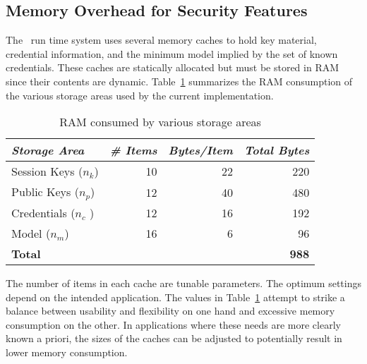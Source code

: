 \subsection{Memory Overhead for Security Features}

The \Sprocket\ run time system uses several memory caches to hold key material, credential
information, and the minimum model implied by the set of known credentials. These caches are
statically allocated but must be stored in RAM since their contents are dynamic.
Table~\ref{table-ram-consumed} summarizes the RAM consumption of the various storage areas used
by the current implementation.

\begin{table}[!t]
  \newcommand\T{\rule{0pt}{2.1ex}}
  \centering
  \caption{RAM consumed by various storage areas}
  {
  \begin{tabular}{|l|r|r|r|} \hline
    \textit{Storage Area} \T & \textit{\# Items} & \textit{Bytes/Item} & \textit{Total Bytes} \\
    \hline \hline

    Session Keys ($n_k$) \T & 10 & 22 & 220 \\ \hline 
    Public Keys ($n_p$)  \T & 12 & 40 & 480 \\ \hline
    Credentials ($n_c$ ) \T & 12 & 16 & 192 \\ \hline
    Model ($n_m$)        \T & 16 &  6 &  96 \\ \hline \hline
    \textbf{Total} \T & \multicolumn{3}{r|}{ \textbf{988} } \\ \hline
  \end{tabular}
  }
  \label{table-ram-consumed}
\end{table}

The number of items in each cache are tunable parameters. The optimum settings depend on the
intended application. The values in Table~\ref{table-ram-consumed} attempt to strike a balance
between usability and flexibility on one hand and excessive memory consumption on the other. In
applications where these needs are more clearly known a priori, the sizes of the caches can be
adjusted to potentially result in lower memory consumption.


